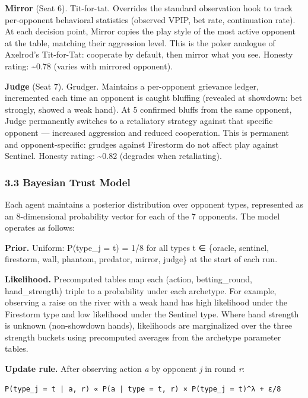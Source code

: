 \documentclass[
]{article}
\begin{document}
\textbf{Mirror} (Seat 6). Tit-for-tat. Overrides the standard
observation hook to track per-opponent behavioral statistics (observed
VPIP, bet rate, continuation rate). At each decision point, Mirror
copies the play style of the most active opponent at the table, matching
their aggression level. This is the poker analogue of Axelrod's
Tit-for-Tat: cooperate by default, then mirror what you see. Honesty
rating: \textasciitilde0.78 (varies with mirrored opponent).

\textbf{Judge} (Seat 7). Grudger. Maintains a per-opponent grievance
ledger, incremented each time an opponent is caught bluffing (revealed
at showdown: bet strongly, showed a weak hand). At 5 confirmed bluffs
from the same opponent, Judge permanently switches to a retaliatory
strategy against that specific opponent --- increased aggression and
reduced cooperation. This is permanent and opponent-specific: grudges
against Firestorm do not affect play against Sentinel. Honesty rating:
\textasciitilde0.82 (degrades when retaliating).

\hypertarget{bayesian-trust-model}{%
\subsubsection{3.3 Bayesian Trust Model}\label{bayesian-trust-model}}

Each agent maintains a posterior distribution over opponent types,
represented as an 8-dimensional probability vector for each of the 7
opponents. The model operates as follows:

\textbf{Prior.} Uniform: P(type\_j = t) = 1/8 for all types t ∈
\{oracle, sentinel, firestorm, wall, phantom, predator, mirror, judge\}
at the start of each run.

\textbf{Likelihood.} Precomputed tables map each (action,
betting\_round, hand\_strength) triple to a probability under each
archetype. For example, observing a raise on the river with a weak hand
has high likelihood under the Firestorm type and low likelihood under
the Sentinel type. Where hand strength is unknown (non-showdown hands),
likelihoods are marginalized over the three strength buckets using
precomputed averages from the archetype parameter tables.

\textbf{Update rule.} After observing action \emph{a} by opponent
\emph{j} in round \emph{r}:

\begin{verbatim}
P(type_j = t | a, r) ∝ P(a | type = t, r) × P(type_j = t)^λ + ε/8
\end{verbatim}
\end{document}
